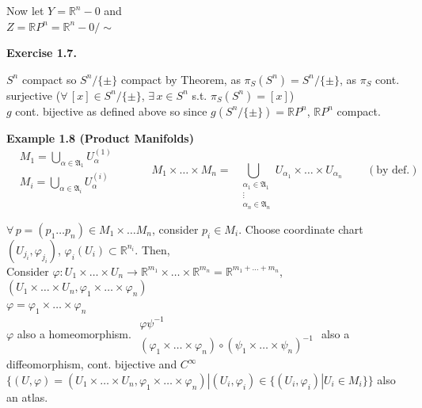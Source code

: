 \documentclass[11pt]{amsart}
\theoremstyle{definition}
\newcommand{\exercisehead}[1]{\medskip\noindent\textbf{Exercise #1.} }
\begin{document}
Now let $Y = \mathbb{R}^n-0$ and \\
\phantom{Now let } $Z = \mathbb{R}P^n = \mathbb{R}^n-0 / \sim$

\exercisehead{1.7}

$S^n$ compact so $S^n/\lbrace \pm \rbrace$ compact by Theorem, as $\pi_S(S^n) = S^n/ \lbrace \pm \rbrace$, as $\pi_S$ cont. surjective ($\forall \, [x] \in S^n/\lbrace \pm \rbrace$, $\exists \, x \in S^n$ s.t. $\pi_S(S^n) = [x]$) \\
$g$ cont. bijective as defined above so since $g(S^n/\lbrace \pm \rbrace) = \mathbb{R}P^n$, $\mathbb{R}P^n$ compact.


\textbf{Example 1.8 (Product Manifolds)}
\[
\begin{aligned}
  & M_1 = \bigcup_{\alpha \in \mathfrak{A}_1} U_{\alpha}^{(1)} \\
  & M_i = \bigcup_{\alpha \in \mathfrak{A}_i} U_{\alpha}^{(i)}
\end{aligned} \quad \quad \quad \,
M_1 \times \dots \times M_n = \bigcup_{ \begin{aligned} & \alpha_1 \in \mathfrak{A}_1 \\
& \vdots \\
    & \alpha_n \in \mathfrak{A}_n \end{aligned} }  U_{\alpha_1} \times \dots \times U_{\alpha_n} \quad \quad \, (\text{by def.})
\]

$\forall \, p = (p_1 \dots p_n) \in M_1 \times \dots M_n$, consider $p_i \in M_i$.  Choose coordinate chart $(U_{j_i}, \varphi_{j_i})$, $\varphi_i(U_i) \subset \mathbb{R}^{n_i}$.  Then,  \\

Consider $\varphi : U_1 \times \dots \times U_n \to \mathbb{R}^{m_1} \times \dots \times \mathbb{R}^{m_n} = \mathbb{R}^{ m_1 + \dots + m_n}$, $(U_1 \times \dots \times U_n, \varphi_1 \times \dots \times \varphi_n)$ \\
$\varphi = \varphi_1 \times \dots \times \varphi_n$\\
$\varphi$ also a homeomorphism.  $\begin{gathered} \varphi \psi^{-1} \\ (\varphi_1 \times \dots \times \varphi_n) \circ(\psi_1 \times \dots \times \psi_n)^{-1} \end{gathered}$ also a diffeomorphism, cont. bijective and $C^{\infty}$ \\
$\lbrace (U, \varphi)  = (U_1 \times \dots \times U_n, \varphi_1 \times \dots \times \varphi_n) | (U_i, \varphi_i) \in \lbrace (U_i, \varphi_i) | U_i \in M_i \rbrace \rbrace$ also an atlas.
\end{document}
